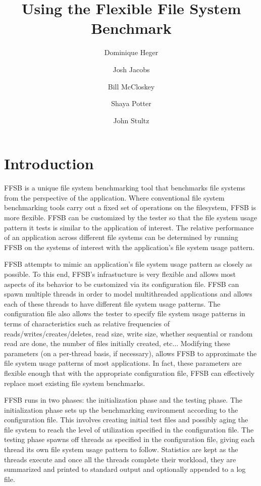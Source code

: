 \documentclass[twocolumn]{article}
\title{Using the Flexible File System Benchmark}
\author{Dominique Heger \and Josh Jacobs\and Bill McCloskey \and Shaya
Potter \and John Stultz}
\begin{document}
\maketitle
\section{Introduction}	

FFSB is a unique file system benchmarking tool that benchmarks file
systems from the perspective of the application. Where conventional
file system benchmarking tools carry out a fixed set of operations on
the filesystem, FFSB is more flexible.  FFSB can be customized by the
tester so that the file system usage pattern it tests is similar to
the application of interest.  The relative performance of an
application across different file systems can be determined by running
FFSB on the systems of interest with the application's file system
usage pattern.

FFSB attempts to mimic an application's file system usage pattern as
closely as possible.  To this end, FFSB's infrastucture is very
flexible and allows most aspects of its behavior to be customized via
its configuration file.  FFSB can spawn multiple threads in order to
model multithreaded applications and allows each of these threads to
have different file system usage patterns.  The configuration file also
allows the tester to specify file system usage patterns in terms of
characteristics such as relative frequencies of
reads/writes/creates/deletes, read size, write size, whether
sequential or random read are done, the number of files initially
created, etc...  Modifying these parameters (on a per-thread basis, if
necessary), allows FFSB to approximate the file system usage patterns
of most applications.  In fact, these parameters are flexible enough
that with the appropriate configuration file, FFSB can effectively
replace most existing file system benchmarks.

FFSB runs in two phases: the initialization phase and the testing
phase.  The initialization phase sets up the benchmarking environment
according to the configuration file.  This involves creating initial
test files and possibly aging the file system to reach the level of
utilization specified in the configuration file.  The testing phase
spawns off threads as specified in the configuration file, giving each
thread its own file system usage pattern to follow.  Statistics
are kept as the threads execute and once all the threads complete
their workload, they are summarized and printed to standard output and
optionally appended to a log file.
\end{document}
